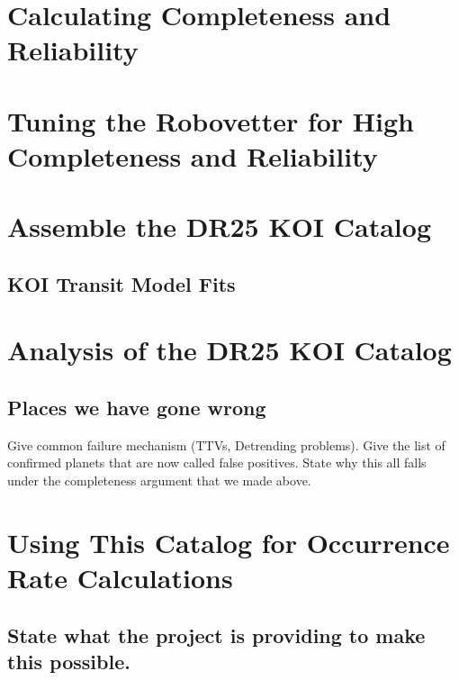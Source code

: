 \documentclass[apj,twocolappendix,numberedappendix]{emulateapj}
\renewcommand{\_}{\discretionary{\underscore}{}{\underscore}}  %
\begin{document}
\section{Calculating Completeness and Reliability}


\section{Tuning the Robovetter for High Completeness and Reliability}



\section{Assemble the DR25 KOI Catalog}


\subsection{KOI Transit Model Fits}


\section{Analysis of the DR25 KOI Catalog}







\subsection{Places we have gone wrong}
Give common failure mechanism (TTVs, Detrending problems).  Give the list of confirmed planets that are now called false positives.  State why this all falls under the completeness argument that we made above.

\section{Using This Catalog for Occurrence Rate Calculations}
\subsection{State what the project is providing to make this possible.}
\end{document}
